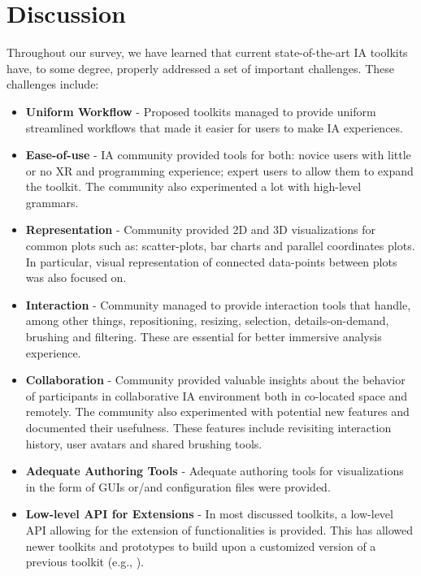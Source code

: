 \documentclass{vgtc}                          %
\begin{document}
\section{Discussion}

Throughout our survey, we have learned that current state-of-the-art IA
toolkits have, to some degree, properly addressed a set of important
challenges. These challenges include:

\begin{itemize}
	\item \textbf{Uniform Workflow} - Proposed toolkits managed to provide
	      uniform streamlined workflows that made it easier for users to make
	      IA experiences.
	\item \textbf{Ease-of-use} - IA community provided tools for both: novice
	      users with little or no XR and programming experience; expert users
	      to allow them to expand the toolkit. The community also experimented
	      a lot with high-level grammars.
	\item \textbf{Representation} - Community provided 2D and 3D visualizations
	      for common plots such as: scatter-plots, bar charts and parallel
	      coordinates plots. In particular, visual representation of connected
	      data-points between plots was also focused on.
	\item \textbf{Interaction} - Community managed to provide interaction tools
	      that handle, among other things, repositioning, resizing, selection,
	      details-on-demand, brushing and filtering. These are essential for
	      better immersive analysis experience.
	\item \textbf{Collaboration} - Community provided valuable insights about
	      the behavior of participants in collaborative IA environment both
	      in co-located space and remotely. The community also experimented
	      with potential new features and documented their usefulness. These
	      features include revisiting interaction history, user avatars and
	      shared brushing tools.
	\item \textbf{Adequate Authoring Tools} - Adequate authoring tools for
	      visualizations in the form of GUIs or/and configuration files were
	      provided.
	\item \textbf{Low-level API for Extensions} - In most discussed toolkits,
	      a low-level API allowing for the extension of functionalities is
	      provided. This has allowed newer toolkits and prototypes to build upon a
          customized version of a previous toolkit
          (e.g., \cite{ragrug_toolkit,fiesta_prototype,hybridaxes_tool}).
\end{itemize}
\end{document}
